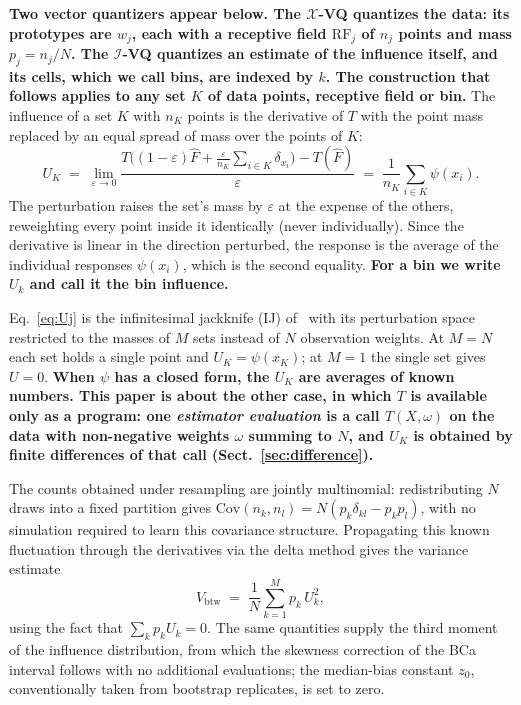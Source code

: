 \documentclass[runningheads]{llncs}
\newif\ifrev \revtrue
\newcommand{\rev}[1]{\ifrev{\color{blue}\bfseries #1}\else#1\fi}
\newcommand{\Vcell}{V_{\mathrm{btw}}}
\newcommand{\XVQ}{\ensuremath{\mathcal{X}}-VQ}
\newcommand{\IVQ}{\ensuremath{\mathcal{I}}-VQ}
\begin{document}
\rev{Two vector quantizers appear below. The \XVQ{} quantizes the data: its prototypes are $w_j$, each with a receptive field $\mathrm{RF}_j$ of $n_j$ points and mass $p_j = n_j/N$. The \IVQ{} quantizes an estimate of the influence itself, and its cells, which we call bins, are indexed by $k$. The construction that follows applies to any set $K$ of data points, receptive field or bin.} The influence of a set $K$ with $n_K$ points is the derivative of $T$ with the point mass replaced by an equal spread of mass over the points of $K$:
%
\begin{equation}\label{eq:Uj}
  U_K \;=\; \lim_{\varepsilon \to 0}
  \frac{T\!\Big((1-\varepsilon)\hat{F}
        + \frac{\varepsilon}{n_K}\sum_{i \in K} \delta_{x_i}\Big)
        - T(\hat{F})}{\varepsilon}
  \;=\; \frac{1}{n_K} \sum_{i \in K} \psi(x_i).
\end{equation}
%
The perturbation raises the set's mass by $\varepsilon$ at the expense of the
others, reweighting every point inside it identically (never individually).
Since the derivative is linear in the direction perturbed, the response is the
average of the individual responses $\psi(x_i)$, which is the second equality. \rev{For a bin we write $U_k$ and call it the bin influence.}

Eq.~\eqref{eq:Uj} is the infinitesimal jackknife (IJ) of~\cite{jaeckel1972} with its perturbation space restricted to the masses of $M$ sets instead of $N$ observation weights. At $M = N$ each set holds a single point and $U_K = \psi(x_K)$; at $M = 1$ the single set gives $U = 0$. \rev{When $\psi$ has a closed form, the $U_K$ are averages of known numbers. This paper is about the other case, in which $T$ is available only as a program: one \emph{estimator evaluation} is a call $T(X,\omega)$ on the data with non-negative weights $\omega$ summing to $N$, and $U_K$ is obtained by finite differences of that call (Sect.~\ref{sec:difference}).}

The counts obtained under resampling are jointly multinomial: redistributing $N$ draws into a fixed partition gives $\mathrm{Cov}(n_k, n_l) = N(p_k \delta_{kl} - p_k p_l)$, with no simulation required to learn this covariance structure. Propagating this known fluctuation through the derivatives via the delta method gives the variance estimate
\begin{equation}\label{eq:Vcell}
\Vcell \;=\; \frac1N \sum_{k=1}^{M} p_k\, U_k^{2},
\end{equation}
using the fact that $\sum_k p_k U_k = 0$. The same quantities supply the third moment of the influence distribution, from which the skewness correction of the BCa interval \cite{efron1987} follows with no additional evaluations; the median-bias constant $z_0$, conventionally taken from bootstrap replicates, is set to zero.
\end{document}
